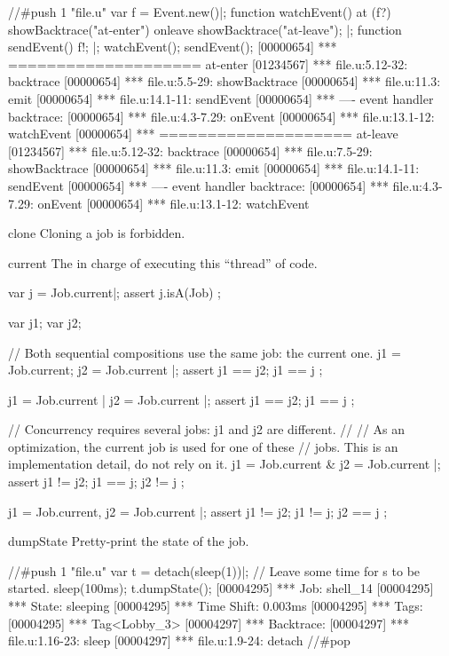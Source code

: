 \begin{urbiscriptapi}
\begin{urbiscript}
//#push 1 "file.u"
var f = Event.new()|;
function watchEvent()
{
  at (f?)
    showBacktrace("at-enter")
  onleave
    showBacktrace("at-leave");
}|;
function sendEvent()
{
  f!;
}|;
watchEvent();
sendEvent();
[00000654] *** ==================== at-enter
[01234567] *** file.u:5.12-32: backtrace
[00000654] *** file.u:5.5-29: showBacktrace
[00000654] *** file.u:11.3: emit
[00000654] *** file.u:14.1-11: sendEvent
[00000654] *** ---- event handler backtrace:
[00000654] *** file.u:4.3-7.29: onEvent
[00000654] *** file.u:13.1-12: watchEvent
[00000654] *** ==================== at-leave
[01234567] *** file.u:5.12-32: backtrace
[00000654] *** file.u:7.5-29: showBacktrace
[00000654] *** file.u:11.3: emit
[00000654] *** file.u:14.1-11: sendEvent
[00000654] *** ---- event handler backtrace:
[00000654] *** file.u:4.3-7.29: onEvent
[00000654] *** file.u:13.1-12: watchEvent
\end{urbiscript}


\item[clone]
  Cloning a job is forbidden.


\item[current]%
  The  in charge of executing this ``thread'' of code.
\begin{urbiscript}
var j = Job.current|;
assert { j.isA(Job) };

var j1; var j2;

// Both sequential compositions use the same job: the current one.
{ j1 = Job.current; j2 = Job.current }|;
assert { j1 == j2; j1 == j };

{ j1 = Job.current | j2 = Job.current }|;
assert { j1 == j2; j1 == j };

// Concurrency requires several jobs: j1 and j2 are different.
//
// As an optimization, the current job is used for one of these
// jobs.  This is an implementation detail, do not rely on it.
{ j1 = Job.current & j2 = Job.current }|;
assert { j1 != j2; j1 == j; j2 != j };

{ j1 = Job.current, j2 = Job.current }|;
assert { j1 != j2; j1 != j; j2 == j };
\end{urbiscript}


\item[dumpState]
  Pretty-print the state of the job.

\begin{urbiscript}
//#push 1 "file.u"
var t = detach(sleep(1))|;
// Leave some time for s to be started.
sleep(100ms);
t.dumpState();
[00004295] *** Job: shell_14
[00004295] ***   State: sleeping
[00004295] ***   Time Shift: 0.003ms
[00004295] ***   Tags:
[00004295] ***     Tag<Lobby_3>
[00004297] ***   Backtrace:
[00004297] ***     file.u:1.16-23: sleep
[00004297] ***     file.u:1.9-24: detach
//#pop
\end{urbiscript}



\end{urbiscriptapi}

